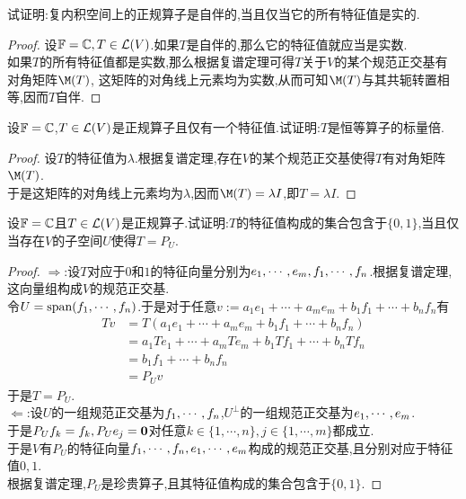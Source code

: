 \documentclass{ctexart}
\begin{document}
\pagestyle{empty}
\begin{center}
    \large{}
\end{center}
\begin{problem}[1.]
    试证明:复内积空间上的正规算子是自伴的,当且仅当它的所有特征值是实的.
\end{problem}
\begin{proof}
    设$\mathbb{F}=\mathbb{C},T\in\mathcal{L}(V)$.如果$T$是自伴的,那么它的特征值就应当是实数.\\
    如果$T$的所有特征值都是实数,那么根据复谱定理可得$T$关于$V$的某个规范正交基有对角矩阵$\M(T)$,%
    这矩阵的对角线上元素均为实数,从而可知$\M(T)$与其共轭转置相等,因而$T$自伴.
\end{proof}
\begin{problem}[2.]
    设$\mathbb{F}=\mathbb{C}$,$T\in\mathcal{L}(V)$是正规算子且仅有一个特征值.试证明:$T$是恒等算子的标量倍.
\end{problem}
\begin{proof}
    设$T$的特征值为$\lambda$.根据复谱定理,存在$V$的某个规范正交基使得$T$有对角矩阵$\M(T)$.\\
    于是这矩阵的对角线上元素均为$\lambda$,因而$\M(T)=\lambda I$,即$T=\lambda I$.
\end{proof}
\begin{problem}[3.]
    设$\mathbb{F}=\mathbb{C}$且$T\in\mathcal{L}(V)$是正规算子.试证明:$T$的特征值构成的集合包含于$\{0,1\}$,当且仅当存在$V$的子空间$U$使得$T=P_U$.
\end{problem}
\begin{proof}
    $\Rightarrow$:设$T$对应于$0$和$1$的特征向量分别为${e}_1,\cdots,{e}_{m},{f}_1,\cdots,{f}_{n}$.根据复谱定理,这向量组构成$V$的规范正交基.\\
    令$U=\text{span}({f}_1,\cdots,{f}_{n})$.于是对于任意$v:=a_1e_1+\cdots+a_me_m+b_1f_1+\cdots+b_nf_n$有
    \[\begin{aligned}
        Tv
        &= T(a_1e_1+\cdots+a_me_m+b_1f_1+\cdots+b_nf_n) \\
        &= a_1Te_1+\cdots+a_mTe_m+b_1Tf_1+\cdots+b_nTf_n \\
        &= b_1f_1+\cdots+b_nf_n \\
        &= P_Uv
    \end{aligned}\]
    于是$T=P_U$.\\
    $\Leftarrow$:设$U$的一组规范正交基为${f}_1,\cdots,{f}_{n}$,$U^\bot$的一组规范正交基为${e}_1,\cdots,{e}_{m}$.\\
    于是$P_Uf_k=f_k,P_Ue_j=\mathbf0$对任意$k\in\{1,\cdots,n\},j\in\{1,\cdots,m\}$都成立.\\
    于是$V$有$P_U$的特征向量${f}_1,\cdots,{f}_{n},{e}_1,\cdots,{e}_{m}$构成的规范正交基,且分别对应于特征值$0,1$.\\
    根据复谱定理,$P_U$是珍贵算子,且其特征值构成的集合包含于$\{0,1\}$.
\end{proof}
\end{document}
